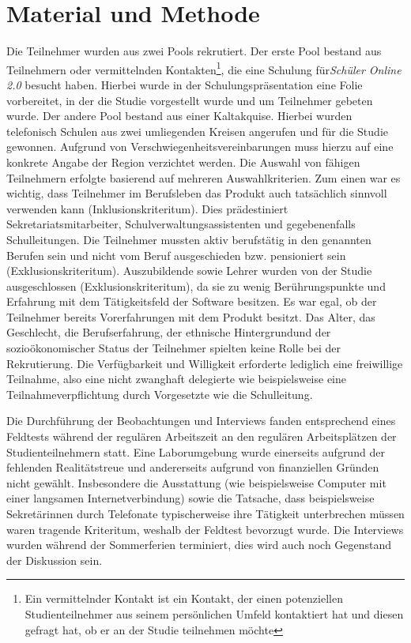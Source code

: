 \newpage
\section{Material und Methode}

Die Teilnehmer wurden aus zwei Pools rekrutiert. Der erste Pool bestand aus Teilnehmern oder vermittelnden Kontakten\footnote{Ein vermittelnder Kontakt ist ein Kontakt, der einen potenziellen Studienteilnehmer aus seinem persönlichen Umfeld kontaktiert hat und diesen gefragt hat, ob er an der Studie teilnehmen möchte}, die eine Schulung für\textit{Schüler Online 2.0} besucht haben. Hierbei wurde in der Schulungspräsentation eine Folie vorbereitet, in der die Studie vorgestellt wurde und um Teilnehmer gebeten wurde. Der andere Pool bestand aus einer Kaltakquise. Hierbei wurden telefonisch Schulen aus zwei umliegenden Kreisen angerufen und für die Studie gewonnen. Aufgrund von Verschwiegenheitsvereinbarungen muss hierzu auf eine konkrete Angabe der Region verzichtet werden.
Die Auswahl von fähigen Teilnehmern erfolgte basierend auf mehreren Auswahlkriterien. Zum einen war es wichtig, dass Teilnehmer im Berufsleben das Produkt auch tatsächlich sinnvoll verwenden kann (Inklusionskriteritum). Dies prädestiniert Sekretariatsmitarbeiter, Schulverwaltungsassistenten und gegebenenfalls Schulleitungen. Die Teilnehmer mussten aktiv berufstätig in den genannten Berufen sein und nicht vom Beruf ausgeschieden bzw. pensioniert sein (Exklusionskriteritum). Auszubildende sowie Lehrer wurden von der Studie ausgeschlossen (Exklusionskriteritum), da sie zu wenig Berührungspunkte und Erfahrung mit dem Tätigkeitsfeld der Software besitzen. Es war egal, ob der Teilnehmer bereits Vorerfahrungen mit dem Produkt besitzt. Das Alter, das Geschlecht, die Berufserfahrung, der ethnische Hintergrundund der sozioökonomischer Status der Teilnehmer spielten keine Rolle bei der Rekrutierung. 
Die Verfügbarkeit und Willigkeit erforderte lediglich eine freiwillige Teilnahme, also eine nicht zwanghaft delegierte wie beispielsweise eine Teilnahmeverpflichtung durch Vorgesetzte wie die Schulleitung.

Die Durchführung der Beobachtungen und Interviews fanden entsprechend eines Feldtests während der regulären Arbeitszeit an den regulären Arbeitsplätzen der Studienteilnehmern statt. Eine Laborumgebung wurde einerseits aufgrund der fehlenden Realitätstreue und andererseits aufgrund von finanziellen Gründen nicht gewählt. Insbesondere die Ausstattung (wie beispielsweise Computer mit einer langsamen Internetverbindung) sowie die Tatsache, dass beispielsweise Sekretärinnen durch Telefonate typischerweise ihre Tätigkeit unterbrechen müssen waren tragende Kriteritum, weshalb der Feldtest bevorzugt wurde. Die Interviews wurden während der Sommerferien terminiert, dies wird auch noch Gegenstand der Diskussion sein.

